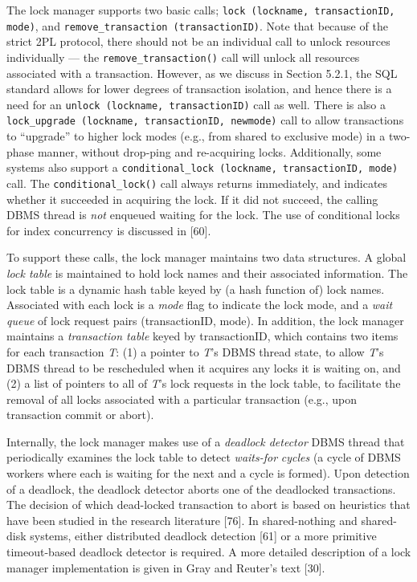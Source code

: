 \documentclass[a4paper,11pt,twoside,openright]{book}
\begin{document}
The lock manager supports two basic calls; \texttt{lock (lockname,
transactionID, mode)}, and \texttt{remove\_transaction (transactionID)}. Note that
because of the strict 2PL protocol, there should not be an individual
call to unlock resources individually --- the \texttt{remove\_transaction()} call
will unlock all resources associated with a transaction. However, as we
discuss in Section 5.2.1, the SQL standard allows for lower degrees of
transaction isolation, and hence there is a need for an \texttt{unlock
(lockname, transactionID)} call as well. There is also a \texttt{lock\_upgrade
(lockname, transactionID, newmode)} call to allow transactions to
``upgrade'' to higher lock modes (e.g., from shared to exclusive mode)
in a two-phase manner, without drop-ping and re-acquiring locks.
Additionally, some systems also support a \texttt{conditional\_lock (lockname,
transactionID, mode)} call. The \texttt{conditional\_lock()} call always returns
immediately, and indicates whether it succeeded in acquiring the lock.
If it did not succeed, the calling DBMS thread is \emph{not} enqueued
waiting for the lock. The use of conditional locks for index concurrency
is discussed in {[}60{]}.

To support these calls, the lock manager maintains two data structures.
A global \emph{lock table} is maintained to hold lock names and their
associated information. The lock table is a dynamic hash table keyed by
(a hash function of) lock names. Associated with each lock is a
\emph{mode} flag to indicate the lock mode, and a \emph{wait queue} of
lock request pairs (transactionID, mode). In addition, the lock manager
maintains a \emph{transaction table} keyed by transactionID, which
contains two items for each transaction \emph{T}: (1) a pointer to
\emph{T}'s DBMS thread state, to allow \emph{T}'s DBMS thread to be
rescheduled when it acquires any locks it is waiting on, and (2) a list
of pointers to all of \emph{T}'s lock requests in the lock table, to
facilitate the removal of all locks associated with a particular
transaction (e.g., upon transaction commit or abort).

Internally, the lock manager makes use of a \emph{deadlock detector}
DBMS thread that periodically examines the lock table to detect
\emph{waits-for} \emph{cycles} (a cycle of DBMS workers where each is
waiting for the next and a cycle is formed). Upon detection of a
deadlock, the deadlock detector aborts one of the deadlocked
transactions. The decision of which dead-locked transaction to abort is
based on heuristics that have been studied in the research literature
{[}76{]}. In shared-nothing and shared-disk systems, either distributed
deadlock detection {[}61{]} or a more primitive timeout-based deadlock
detector is required. A more detailed description of a lock manager
implementation is given in Gray and Reuter's text {[}30{]}.
\end{document}
